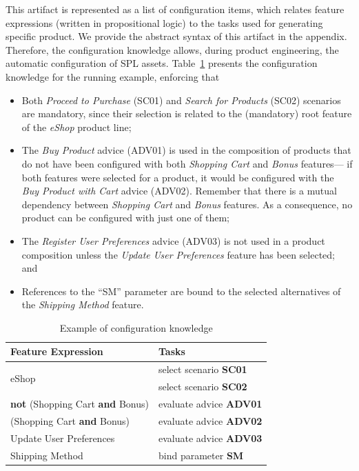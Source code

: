 \documentclass{acm_proc_article-sp}
\begin{document}
This artifact is represented as a list of configuration items, which relates
feature expressions (written in propositional logic) to the tasks used for
generating specific product. We provide the abstract syntax of this artifact in the appendix. Therefore, the configuration knowledge allows,
during product engineering, the automatic configuration of SPL assets.
Table~\ref{tab:eshop-ck} presents the configuration
knowledge for the running example, enforcing that


\begin{itemize}
\item Both \emph{Proceed to Purchase} (SC01) and \emph{Search for Products}
(SC02) scenarios are mandatory, since their selection is related to the
(mandatory) root feature of the \emph{eShop} product line;

\item The \emph{Buy Product} advice (ADV01) is used in the composition of
products that do not have been configured with both \emph{Shopping Cart} and \emph{Bonus}
features--- if both features were selected for a product, it would be configured
with the \emph{Buy Product with Cart} advice (ADV02). Remember that there is a
mutual dependency between \emph{Shopping Cart} and \emph{Bonus} features. As a
consequence, no product can be configured with just one of them;

\item The \emph{Register User Preferences} advice (ADV03) is not used in a
product composition unless the \emph{Update User Preferences} feature has been
selected; and

\item References to the ``SM'' parameter are bound to the
selected alternatives of the \emph{Shipping Method} feature.

\end{itemize}


\begin{table}[htb]
\begin{small}
\begin{tabular}{|lp{1.4in}|}
\hline
Feature Expression  						& Tasks					 \\ \hline

\multirow{2}{*}{eShop}						& select scenario {\bf SC01} \\
											& select scenario {\bf SC02} \\	\hline
{\bf not} (Shopping Cart {\bf and} Bonus) 	& evaluate advice {\bf ADV01} \\
\hline (Shopping Cart {\bf and} Bonus) 		& evaluate advice {\bf ADV02} 	\\
\hline Update User Preferences 				& evaluate advice {\bf ADV03} \\ \hline
Shipping Method								& bind parameter {\bf SM}\\ \hline
								
\end{tabular}
\end{small}
\caption{Example of configuration knowledge}
\label{tab:eshop-ck}
\end{table}
\end{document}
